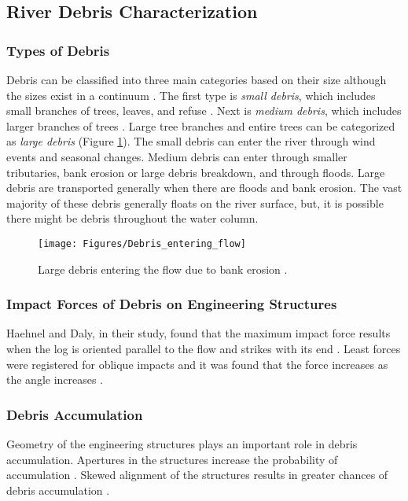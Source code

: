 \subsection{River Debris Characterization}
\subsubsection{Types of Debris}
Debris can be classified into three main categories based on their size although the sizes exist in a continuum \cite{Reference1}. The first type is \textit{small debris}, which includes small branches of trees, leaves, and refuse \cite{Reference1}. Next is \textit{medium debris}, which includes larger branches of trees \cite{Reference1}. Large tree branches and entire trees can be categorized as \textit{large debris} (Figure \ref{fig:Debris_entering_flow})\cite{Reference1}. The small debris can enter the river through wind events and seasonal changes. Medium debris can enter through smaller tributaries, bank erosion or large debris breakdown, and through floods. Large debris are transported generally when there are floods and bank erosion. The vast majority of these debris generally floats on the river surface, but, it is possible there might be debris throughout the water column.
\begin{figure}
\centering
\texttt{[image: Figures/Debris\_entering\_flow]}
\caption{\label{fig:Debris_entering_flow}Large debris entering the flow due to bank erosion \cite{Reference1}.}
\end{figure}

\subsubsection{Impact Forces of Debris on Engineering Structures}
Haehnel and Daly, in their study, found that the maximum impact force results when the log is oriented parallel to the flow and strikes with its end \cite{Reference2}. Least forces were registered for oblique impacts and it was found that the force increases as the angle increases \cite{Reference2}. 
\subsubsection{Debris Accumulation}
Geometry of the engineering structures plays an important role in debris accumulation. Apertures in the structures increase the probability of accumulation \cite{Reference3}. Skewed alignment of the structures results in greater chances of debris accumulation \cite{Reference3}.

